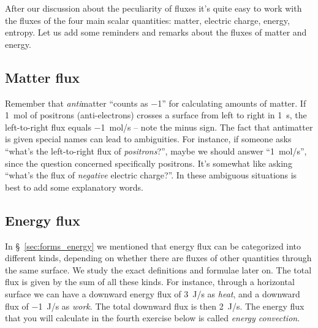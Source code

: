 \documentclass[a4paper,12pt,%
onecolumn,oneside,titlepage,%
british%
]{memoir}
\renewcommand*{\|}[1][]{\nonscript\:#1\vert\nonscript\:\mathopen{}}
\newcommand*{\sect}{\S}%
\begin{document}
\bigskip

After our discussion about the peculiarity of fluxes it's quite easy to work with the fluxes of the four main scalar quantities: matter, electric charge, energy, entropy. Let us add some reminders and remarks about the fluxes of matter and energy.


\subsection{Matter flux}
\label{sec:matter_flux}

Remember that \emph{anti}matter \enquote{counts as \num{-1}} for calculating amounts of matter. If \qty{1}{mol} of positrons (anti-electrons) crosses a surface from left to right in \qty{1}{s}, the left-to-right flux equals \qty{-1}{mol/s} -- note the minus sign. The fact that antimatter is given special names can lead to ambiguities. For instance, if someone asks \enquote{what's the left-to-right flux of \emph{positrons}?}, maybe we should answer \enquote{\qty{1}{mol/s}}, since the question concerned specifically positrons. It's somewhat like asking \enquote{what's the flux of \emph{negative} electric charge?}. In these ambiguous situations is best to add some explanatory words.

\subsection{Energy flux}
\label{sec:energy_flux}
In \sect~\ref{sec:forms_energy} we mentioned that energy flux can be categorized into different kinds, depending on whether there are fluxes of other quantities through the same surface. We study the exact definitions and formulae later on. The total flux is given by the sum of all these kinds. For instance, through a horizontal surface we can have a downward energy flux of \qty{3}{J/s} as \emph{heat}, and a downward flux of \qty{-1}{J/s} as \emph{work}. The total downward flux is then \qty{2}{J/s}. The energy flux that you will calculate in the fourth exercise below is called \emph{energy convection}.

\bigskip
\end{document}
